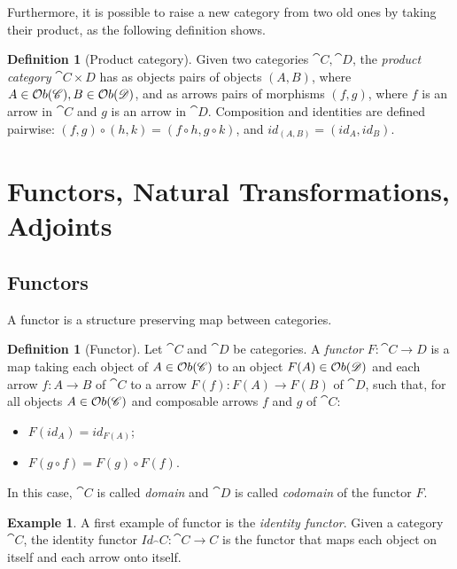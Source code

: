 \documentclass[a4paper, twoside,openright]{report}
\theoremstyle{plain}
\theoremstyle{definition}
\newtheorem{definition}[theorem]{Definition}
\newtheorem{example}[theorem]{Example}
\begin{document}
Furthermore, it is possible to raise a new category from two old ones by taking their product, as the following definition shows.

\begin{definition}[Product category]
    Given two categories $\cat C, \cat D$, the \emph{product category} $\cat{C\times D}$ has as objects pairs of objects $(A, B)$, where $A \in \mathcal{O}b(\mathscr{C}), B \in \mathcal{O}b(\mathscr{D})$, and as arrows pairs of morphisms $(f, g)$, where $f$ is an arrow in $\cat C$ and $g$ is an arrow in $\cat D$. Composition and identities are defined pairwise: $(f, g) \circ (h, k) = (f \circ h, g \circ k)$, and $id_{(A, B)} = (id_A, id_B)$.

\end{definition}

\section{Functors, Natural Transformations, Adjoints}\label{sect:funct_nats}


\subsection{Functors}

A functor is a structure preserving map between categories. 
\begin{definition}[Functor]
    Let $\cat{C}$ and $\cat{D}$ be categories. A \emph{functor} $F:\cat{C \rightarrow D}$ is a map taking each object of $A \in \mathcal{O}b(\mathscr{C})$ to an object $F(A) \in \mathcal{O}b(\mathscr{D})$ and each arrow $f:A\rightarrow B$ of $\cat C$ to a arrow $F(f): F(A) \rightarrow F(B)$ of $\cat D$, such that, for all objects $A \in \mathcal{O}b(\mathscr{C})$ and composable arrows $f$ and $g$ of $\cat C$:
    \begin{itemize}
        \item $F(id_{A}) = id_{F(A)}$;
        \item $F(g \circ f) = F(g) \circ F(f)$.
    \end{itemize}

    In this case, $\cat C$ is called \emph{domain} and $\cat D$ is called \emph{codomain} of the functor $F$.
\end{definition}

\begin{example}
    A first example of functor is the \emph{identity functor}. Given a category $\cat C$, the identity functor $Id_\cat C :\cat{C \rightarrow C}$ is the functor that maps each object on itself and each arrow onto itself. 
\end{example}
\end{document}
